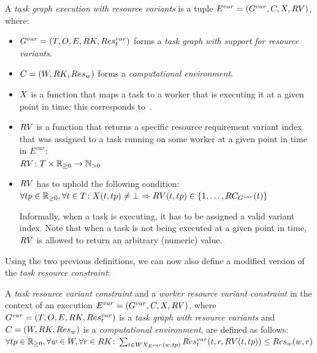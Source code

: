 \vspace{2mm}
 A
\emph{task graph execution with resource variants} is a tuple $E^{var} = (G^{var}, C, X,
RV)$, where:
\begin{itemize}[itemsep=0pt]
	\item $G^{var} = (T, O, E, RK, Res_t^{var})$ forms a
	\emph{task graph with support for resource variants}.
	\item $C = (W, RK, Res_w)$ forms a \emph{computational environment}.
	\item $X$ is a function that maps a task to a worker that is executing it
	at a given point in time; this corresponds to~.
	\item $RV$ is a function that returns a specific resource requirement variant
	index that was assigned to a task running on some worker at a given point in
	time in $E^{var}$: \\ $RV\colon T \times \mathbb{R}_{\geq{}0} \rightarrow
	\mathbb{N}_{>0}$
	\item $RV$ has to uphold the following condition: \\
	$\forall tp\in\mathbb{R}_{\geq{}0}, \forall t\in{}T\colon X(t, tp) \ne \bot \Rightarrow
	RV(t, tp) \in \{1,\ldots,RC_{G^{var}}(t)\}$

	Informally, when a task is executing, it has to be assigned a valid variant index. Note that
	when a task is not being executed at a given point in time, $RV$
	is allowed to return an arbitrary (numeric) value.
\end{itemize}

Using the two previous definitions, we can now also define a modified version of the
\emph{task resource constraint}:

\vspace{2mm}
 A
\emph{task resource variant constraint}
and a \emph{worker resource variant constraint} in the context of an execution $E^{var} = (G^{var}, C, X, RV)$, where $G^{var} = (T, O, E, RK, Res_t^{var})$ is
a \emph{task graph with resource variants} and $C = (W, RK, Res_w)$ is a
\emph{computational environment}, are defined as follows: \vspace{1mm}\\
$\forall tp\in\mathbb{R}_{\geq{}0}, \forall w\in{}W, \forall
r\in{}RK\colon \sum_{t\in{}WX_{E^{var}}(w, tp)} Res_t^{var}(t, r, RV(t, tp)) \leq
Res_w(w, r)$

